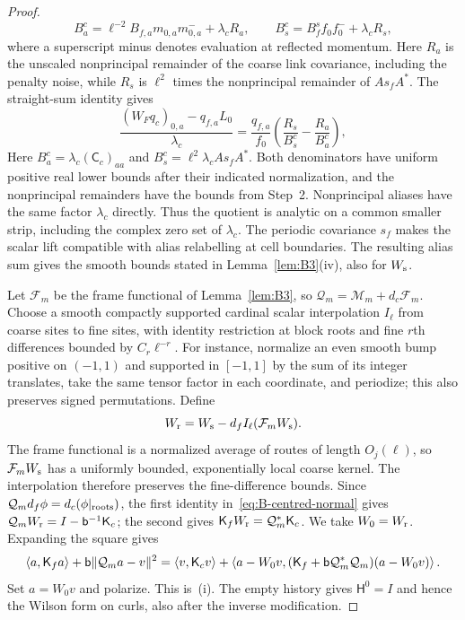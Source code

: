 \begin{proof}
\begin{equation*}
B_a^c=\ell^{-2}B_{f,a}m_{0,a}m_{0,a}^-+\lambda_cR_a,\qquad
B_s^c=B_f^sf_0f_0^-+\lambda_cR_s,
\end{equation*}
where a superscript minus denotes evaluation at reflected momentum. Here $R_a$ is the unscaled nonprincipal remainder of the coarse link covariance, including the penalty noise, while $R_s$ is $\ell^2$ times the nonprincipal remainder of $As_fA^*$. The straight-sum identity gives
\begin{equation*}
\frac{(W_Fq_c)_{0,a}-q_{f,a}L_0}{\lambda_c}
=\frac{q_{f,a}}{f_0}\left(\frac{R_s}{B_s^c}-\frac{R_a}{B_a^c}\right),
\end{equation*}
Here $B_a^c=\lambda_c(\mathsf C_c)_{aa}$ and $B_s^c=\ell^2\lambda_c As_fA^*$. Both denominators have uniform positive real lower bounds after their indicated normalization, and the nonprincipal remainders have the bounds from Step~2. Nonprincipal aliases have the same factor $\lambda_c$ directly. Thus the quotient is analytic on a common smaller strip, including the complex zero set of $\lambda_c$. The periodic covariance $s_f$ makes the scalar lift compatible with alias relabelling at cell boundaries. The resulting alias sum gives the smooth bounds stated in Lemma~\ref{lem:B3}(iv), also for $W_{\rm s}$.

Let $\mathcal F_m$ be the frame functional of Lemma~\ref{lem:B3}, so $\mathcal Q_m=\mathcal M_m+d_c\mathcal F_m$. Choose a smooth compactly supported cardinal scalar interpolation $I_\ell$ from coarse sites to fine sites, with identity restriction at block roots and fine $r$th differences bounded by $C_r\ell^{-r}$. For instance, normalize an even smooth bump positive on $(-1,1)$ and supported in $[-1,1]$ by the sum of its integer translates, take the same tensor factor in each coordinate, and periodize; this also preserves signed permutations. Define
\begin{equation}\label{eq:B-root-centred}
W_{\rm r}=W_{\rm s}-d_f I_\ell(\mathcal F_mW_{\rm s}).
\end{equation}
The frame functional is a normalized average of routes of length $O_j(\ell)$, so $\mathcal F_mW_{\rm s}$ has a uniformly bounded, exponentially local coarse kernel. The interpolation therefore preserves the fine-difference bounds. Since $\mathcal Q_md_f\phi=d_c(\phi|_{\rm roots})$, the first identity in~\eqref{eq:B-centred-normal} gives $\mathcal Q_mW_{\rm r}=I-\mathsf{b}^{-1}\mathsf K_c$; the second gives $\mathsf K_fW_{\rm r}=\mathcal Q_m^*\mathsf K_c$. We take $W_0=W_{\rm r}$. Expanding the square gives
\begin{equation*}
\langle a,\mathsf K_fa\rangle+\mathsf{b}\|\mathcal Q_ma-v\|^2
=\langle v,\mathsf K_cv\rangle+\langle a-W_0v,(\mathsf K_f+\mathsf{b}\mathcal Q_m^*\mathcal Q_m)(a-W_0v)\rangle\,.
\end{equation*}
Set $a=W_0v$ and polarize. This is~(i). The empty history gives $\mathsf H^0=I$ and hence the Wilson form on curls, also after the inverse modification.


\end{proof}
